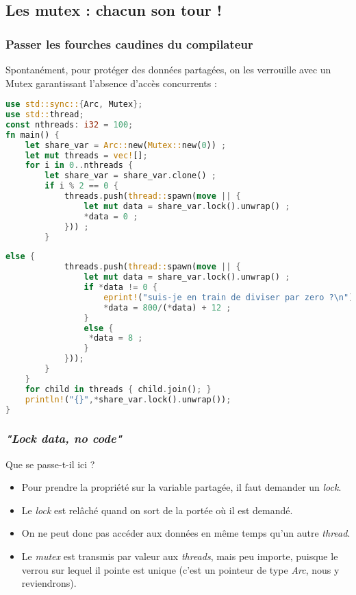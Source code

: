 \subsection{Les mutex : chacun son tour !}
\begin{frame}[fragile]
  \frametitle{Passer les fourches caudines du compilateur}
Spontanément, pour protéger des données partagées, on les verrouille avec un Mutex garantissant l'absence d'accès concurrents :
\begin{lstlisting}[language=rust, basicstyle=\tiny{}]
use std::sync::{Arc, Mutex};
use std::thread;
const nthreads: i32 = 100;
fn main() {
    let share_var = Arc::new(Mutex::new(0)) ;
    let mut threads = vec![];
    for i in 0..nthreads {
        let share_var = share_var.clone() ;
        if i % 2 == 0 {
            threads.push(thread::spawn(move || {
                let mut data = share_var.lock().unwrap() ;
                *data = 0 ;
            })) ;
        }
\end{lstlisting}
\end{frame}
\begin{frame}[fragile]
  \begin{lstlisting}[language=rust, basicstyle=\tiny{}]
        else {
            threads.push(thread::spawn(move || {
                let mut data = share_var.lock().unwrap() ;
                if *data != 0 {
                    eprint!("suis-je en train de diviser par zero ?\n");
                    *data = 800/(*data) + 12 ;
                }
                else {
                 *data = 8 ;
                }
            }));
        }
    }
    for child in threads { child.join(); }
    println!("{}",*share_var.lock().unwrap());
}
  \end{lstlisting}
\end{frame}
\begin{frame}[fragile]
  \frametitle{\textit{"Lock data, no code"}}
Que se passe-t-il ici ?
\begin{itemize}
\item Pour prendre la propriété sur la variable partagée, il faut demander un \textit{lock}.
\item Le \textit{lock} est relâché quand on sort de la portée où il est demandé.
\item On ne peut donc pas accéder aux données en même temps qu'un autre \textit{thread}.
\item Le \textit{mutex} est transmis par valeur aux \textit{threads}, mais peu importe, puisque le verrou sur lequel il pointe est unique (c'est un pointeur de type \textit{Arc}, nous y reviendrons).
\end{itemize}
\end{frame}

